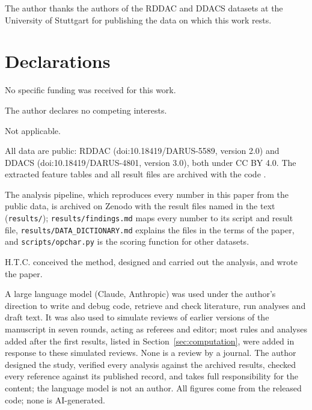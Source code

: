\documentclass[pdflatex,sn-basic,lineno]{sn-jnl}
\begin{document}
The author thanks the authors of the RDDAC and DDACS datasets at the University of Stuttgart for publishing the data on which this work rests.

\section*{Declarations}

No specific funding was received for this work.

The author declares no competing interests.

Not applicable.

All data are public: RDDAC (doi:10.18419/DARUS-5589, version 2.0) and DDACS (doi:10.18419/DARUS-4801, version 3.0), both under CC BY 4.0. The extracted feature tables and all result files are archived with the code \citep{canseven2026archive}.

The analysis pipeline, which reproduces every number in this paper from the public data, is archived on Zenodo \citep{canseven2026archive} with the result files named in the text (\texttt{results/}); \texttt{results/findings.md} maps every number to its script and result file, \texttt{results/DATA\_DICTIONARY.md} explains the files in the terms of the paper, and \texttt{scripts/opchar.py} is the scoring function for other datasets.

H.T.C. conceived the method, designed and carried out the analysis, and wrote the paper.

A large language model (Claude, Anthropic) was used under the author's direction to write and debug code, retrieve and check literature, run analyses and draft text. It was also used to simulate reviews of earlier versions of the manuscript in seven rounds, acting as referees and editor; most rules and analyses added after the first results, listed in Section~\ref{sec:computation}, were added in response to these simulated reviews. None is a review by a journal. The author designed the study, verified every analysis against the archived results, checked every reference against its published record, and takes full responsibility for the content; the language model is not an author. All figures come from the released code; none is AI-generated.


\FloatBarrier
{\small
}
\end{document}
